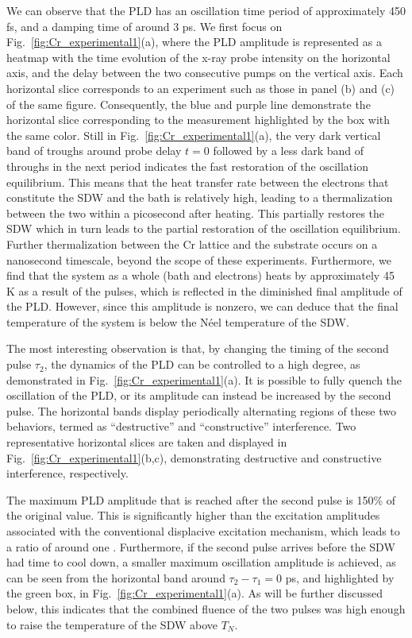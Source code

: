 We can observe that the \gls{PLD} has an oscillation time period of approximately 450 fs, and a damping time of around 3 ps.
We first focus on Fig.~\ref{fig:Cr_experimental1}(a), where the \gls{PLD} amplitude is represented as a heatmap with the time evolution of the x-ray probe intensity on the horizontal axis, and the delay between the two consecutive pumps on the vertical axis. Each horizontal slice corresponds to an experiment such as those in panel (b) and (c) of the same figure. Consequently, the blue and purple line demonstrate the horizontal slice corresponding to the measurement highlighted by the box with the same color.  
Still in Fig.~\ref{fig:Cr_experimental1}(a), the very dark vertical band of troughs around probe delay $t = 0$ followed by a less dark band of throughs in the next period indicates the fast restoration of the oscillation equilibrium. 
This means that the heat transfer rate between the electrons that constitute the \gls{SDW} and the bath is relatively high, leading to a thermalization between the two within a picosecond after heating.
This partially restores the \gls{SDW} which in turn leads to the partial restoration of the oscillation equilibrium.
Further thermalization between the Cr lattice and the substrate occurs on a nanosecond timescale, beyond the scope of these experiments.
Furthermore, we find that the system as a whole (bath and electrons) heats by approximately 45 K as a result of the pulses, which is reflected in the diminished final amplitude of the \gls{PLD}.
However, since this amplitude is nonzero, we can deduce that the final temperature of the system is below the N\'eel temperature of the \gls{SDW}.

The most interesting observation is that, by changing the timing of the second pulse $\tau_2$, the dynamics of the \gls{PLD} can be controlled to a high degree, as demonstrated in Fig.~\ref{fig:Cr_experimental1}(a).
It is possible to fully quench the oscillation of the \gls{PLD}, or its amplitude can instead be increased by the second pulse.
The horizontal bands display periodically alternating regions of these two behaviors, termed as ``destructive'' and ``constructive'' interference.
Two representative horizontal slices are taken and displayed in Fig.~\ref{fig:Cr_experimental1}(b,c), demonstrating destructive and constructive interference, respectively. 

The maximum \gls{PLD} amplitude that is reached after the second pulse is 150\% of the original value.
This is significantly higher than the excitation amplitudes associated with the conventional displacive excitation mechanism, which leads to a ratio of around one \cite{Singer2015prl,Zeiger1992}. 
Furthermore, if the second pulse arrives before the \gls{SDW} had time to cool down, a smaller maximum oscillation amplitude is achieved, as can be seen from the horizontal band around $\tau_2 - \tau_1 = 0$ ps, and highlighted by the green box, in Fig.~\ref{fig:Cr_experimental1}(a).
As will be further discussed below, this indicates that the combined fluence of the two pulses was high enough to raise the temperature of the \gls{SDW} above $T_N$.

